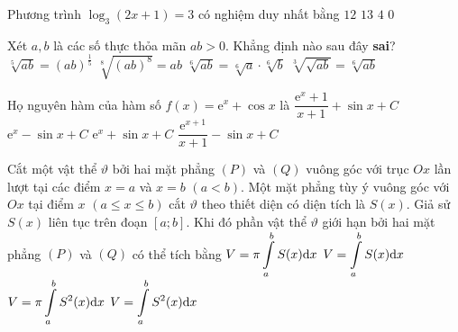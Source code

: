 \begin{ex}%
Phương trình $\log _3\left( 2x + 1 \right) = 3$ có nghiệm duy nhất bằng
\choice
	{$12$} 			
 	{\True $13$}			 
	{$4$} 			
	{$0$}
\end{ex}

\begin{ex}%
Xét $a,b$ là các số thực thỏa mãn $ab > 0$. Khẳng định nào sau đây \textbf{sai}?
\choice
	{$\sqrt[5]{ab} = \left( ab \right)^{\frac{1}{5}}$} 		
	{$\sqrt[8]{\left( ab \right)^8} = ab$} 	
	{\True $\sqrt[6]{ab} = \sqrt[6]{a} \cdot \sqrt[6]{b}$} 	
	{$\sqrt[3]{{\sqrt {ab} }} = \sqrt[6]{ab}$} 
\end{ex}

\begin{ex}%
Họ nguyên hàm của hàm số $f(x) = \mathrm{e}^x + \cos x$ là
\choice
	{$\dfrac{\mathrm{e}^x + 1}{x + 1} + \sin x + C$}		
	{$\mathrm{e}^x - \sin x + C$}		
	{\True $\mathrm{e}^x + \sin x + C$} 	
	{$\dfrac{\mathrm{e}^{x + 1}}{x + 1} - \sin x + C$}
\end{ex}

\begin{ex}%
Cắt một vật thể $\vartheta $ bởi hai mặt phẳng $(P)$ và $(Q)$ vuông góc với trục $Ox$ lần lượt tại các điểm $x=a$ và $x=b$ $(a<b).$ Một mặt phẳng tùy ý vuông góc với $Ox$ tại điểm $x$ $\left( {a \le x \le b} \right)$ cắt $\vartheta $ theo thiết diện có diện tích là $S(x).$ Giả sử  $S(x)$ liên tục trên đoạn $[a;b].$ Khi đó phần vật thể $\vartheta $ giới hạn bởi hai mặt phẳng $(P)$ và $(Q)$ có thể tích bằng 
 \choice
	{$V = \pi \displaystyle \int\limits_a^b {S(x){\rm{d}}x} $}		
	{\True $V = \displaystyle \int\limits_a^b {S(x){\rm{d}}x} $}	
	{$V = \pi \displaystyle\int\limits_a^b {{S^2}(x){\rm{d}}x} $}	
	{$V = \displaystyle\int\limits_a^b {{S^2}(x){\rm{d}}x} $}
\end{ex}

